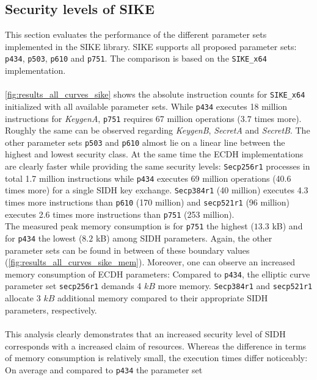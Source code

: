 \subsection{Security levels of SIKE}\label{sec:levels_sike}
This section evaluates the performance of the different parameter sets implemented in the \gls{SIKE} library.  \gls{SIKE} supports all proposed parameter sets: \texttt{p434}, \texttt{p503}, \texttt{p610} and \texttt{p751}. The comparison is based on the \texttt{SIKE\_x64} implementation.
\\\\
\autoref{fig:results_all_curves_sike} shows the absolute instruction counts for \texttt{SIKE\_x64} initialized with all available parameter sets. While \texttt{p434} executes 18 million instructions for \textit{KeygenA}, \texttt{p751} requires 67 million operations ($3.7$ times more). Roughly the same can be observed regarding \textit{KeygenB}, \textit{SecretA} and \textit{SecretB}. The other parameter sets \texttt{p503} and \texttt{p610} almost lie on a linear line between the highest and lowest security class. At the same time the \gls{ECDH} implementations are clearly faster while providing the same security levels: \texttt{Secp256r1} processes in total 1.7 million instructions while \texttt{p434} executes 69 million operations (40.6 times more) for a single \gls{SIDH} key exchange. \texttt{Secp384r1} (40 million) executes 4.3 times more instructions than \texttt{p610} (170 million) and \texttt{secp521r1} (96 million) executes 2.6 times more instructions than \texttt{p751} (253 million).\\
The measured peak memory consumption is for \texttt{p751} the highest ($13.3$ \gls{kB}) and for \texttt{p434} the lowest ($8.2$ \gls{kB}) among \gls{SIDH} parameters. Again, the other parameter sets can be found in between of these boundary values (\autoref{fig:results_all_curves_sike_mem}). Moreover, one can observe an increased memory consumption of \gls{ECDH} parameters: Compared to \texttt{p434}, the elliptic curve parameter set \texttt{secp256r1} demands 4 $kB$ more memory. \texttt{Secp384r1} and \texttt{secp521r1} allocate 3 $kB$ additional memory compared to their appropriate \gls{SIDH} parameters, respectively.\\\\
This analysis clearly demonstrates that an increased security level of \gls{SIDH} corresponds with a increased claim of resources. Whereas the difference in terms of memory consumption is relatively small, the execution times differ noticeably: On average and compared to \texttt{p434} the parameter set
